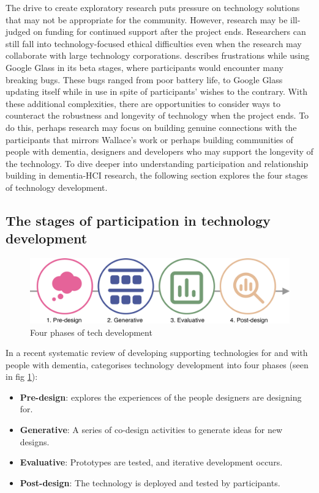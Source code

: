 The drive to create exploratory research puts pressure on technology solutions that may not be appropriate for the community. However, research may be ill-judged on funding for continued support after the project ends. Researchers can still fall into technology-focused ethical difficulties even when the research may collaborate with large technology corporations. \cite{vines_our_2017} describes frustrations while using Google Glass in its beta stages, where participants would encounter many breaking bugs. These bugs ranged from poor battery life, to Google Glass updating itself while in use in spite of participants' wishes to the contrary. With these additional complexities, there are opportunities to consider ways to counteract the robustness and longevity of technology when the project ends. To do this, perhaps research may focus on building genuine connections with the participants that mirrors Wallace's work or perhaps building communities of people with dementia, designers and developers who may support the longevity of the technology. To dive deeper into understanding participation and relationship building in dementia-HCI research, the following section explores the four stages of technology development.

\subsection{The stages of participation in technology development}
\label{BL:StagesofTech}

\begin{figure}[htp]
    \centering
    \includegraphics[width=0.8\linewidth]{Images/ChapterTwo/PhasesOfTech.png}
    \caption{Four phases of tech development \citep{suijkerbuijk_active_2019}}
    \label{fig:PhasesOfTech}
\end{figure}
In a recent systematic review of developing supporting technologies for and with people with dementia, \cite{suijkerbuijk_active_2019} categorises technology development into four phases (seen in fig \ref{fig:PhasesOfTech}):

\begin{itemize}
    \item \textbf{Pre-design}: explores the experiences of the people designers are designing for.
    \item \textbf{Generative}: A series of co-design activities to generate ideas for new designs.
    \item \textbf{Evaluative}: Prototypes are tested, and iterative development occurs.
    \item \textbf{Post-design}: The technology is deployed and tested by participants.
\end{itemize}

